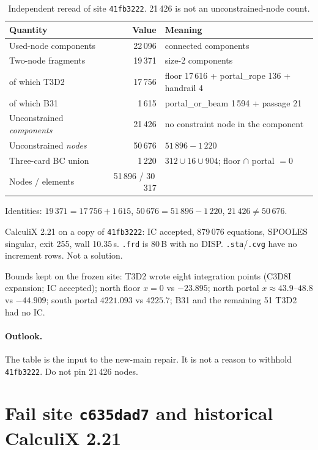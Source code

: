 \documentclass[11pt,a4paper]{article}
\begin{document}
\begin{table}[ht]
\centering
\caption{Independent reread of site \texttt{41fb3222}.
21\,426 is not an unconstrained-node count.}
\label{tab:defs}
\begin{tabular}{lrl}
\toprule
Quantity & Value & Meaning \\
\midrule
Used-node components & 22\,096 & connected components \\
Two-node fragments & 19\,371 & size-2 components \\
\quad of which T3D2 & 17\,756 & floor 17\,616 + portal\_rope 136 + handrail 4 \\
\quad of which B31 & 1\,615 & portal\_or\_beam 1\,594 + passage 21 \\
Unconstrained \emph{components} & 21\,426 & no constraint node in the component \\
Unconstrained \emph{nodes} & 50\,676 & \(51\,896-1\,220\) \\
Three-card BC union & 1\,220 & \(312\cup 16\cup 904\); floor \(\cap\) portal \(=0\) \\
Nodes / elements & 51\,896 / 30\,317 & \\
\bottomrule
\end{tabular}
\end{table}

Identities: \(19\,371=17\,756+1\,615\), \(50\,676=51\,896-1\,220\),
\(21\,426\neq 50\,676\).

CalculiX 2.21 on a copy of \texttt{41fb3222}: IC accepted, 879\,076
equations, SPOOLES singular, exit 255, wall 10.35\,s. \texttt{.frd} is 80\,B
with no DISP. \texttt{.sta}/\texttt{.cvg} have no increment rows. Not a
solution.

Bounds kept on the frozen site: T3D2 wrote eight integration points (C3D8I
expansion; IC accepted); north floor \(x=0\) vs \(-23.895\); north portal
\(x\approx 43.9\)--\(48.8\) vs \(-44.909\); south portal \(4221.093\) vs
\(4225.7\); B31 and the remaining 51 T3D2 had no IC.

\paragraph{Outlook.}
The table is the input to the new-main repair. It is not a reason to
withhold \texttt{41fb3222}. Do not pin 21\,426 nodes.

\section{Fail site \texttt{c635dad7} and historical CalculiX 2.21}
\label{sec:new}
\end{document}
